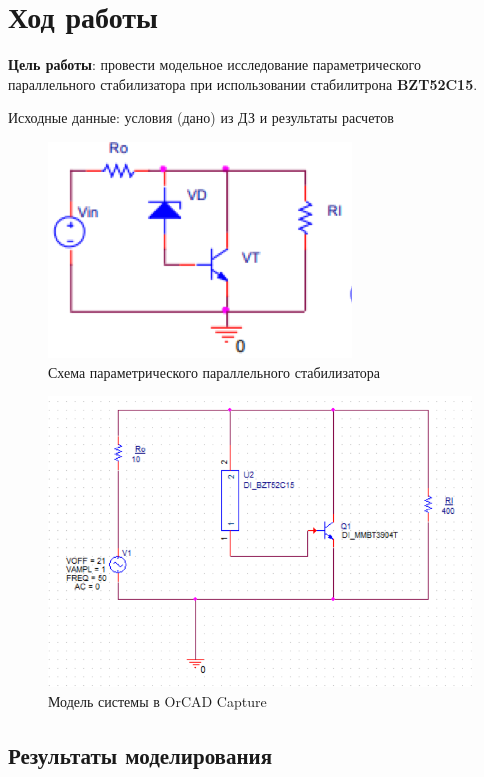 \chapter{Ход работы}

\textbf{Цель работы}: провести модельное исследование параметрического параллельного стабилизатора при использовании стабилитрона \textbf{BZT52C15}.

Исходные данные: условия (дано) из ДЗ и результаты расчетов

\begin{figure}[h!]
	\centering
	\caption{Схема параметрического параллельного стабилизатора}
	\includegraphics{images/scheme1.png}
\end{figure}


\begin{figure}[h!]
	\centering
	\caption{Модель системы в OrCAD Capture}
	\includegraphics{images/scheme2.png}
\end{figure}

\section{Результаты моделирования}

